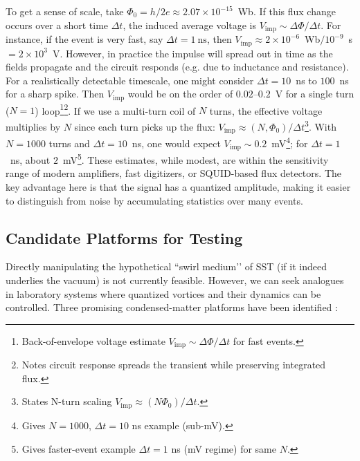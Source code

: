 \documentclass[12pt]{article}
\begin{document}
To get a sense of scale, take $\Phi_{0}=h/2e\approx2.07\times10^{-15}$~Wb. If this flux change occurs over a short time $\Delta t$, the induced average voltage is $V_{\text{imp}} \sim \Delta \Phi/\Delta t$. For instance, if the event is very fast, say $\Delta t = 1~\text{ns}$, then $V_{\text{imp}}\approx 2\times10^{-6}$~Wb$/10^{-9}$~s $= 2\times10^{3}$~V. However, in practice the impulse will spread out in time as the fields propagate and the circuit responds (e.g. due to inductance and resistance). For a realistically detectable timescale, one might consider $\Delta t = 10$~ns to $100$~ns for a sharp spike. Then $V_{\text{imp}}$ would be on the order of $0.02$--$0.2$~V for a single turn ($N=1$) loop\footnote{Back-of-envelope voltage estimate $V_{\text{imp}}\sim\Delta\Phi/\Delta t$ for fast events.}\footnote{Notes circuit response spreads the transient while preserving integrated flux.}. If we use a multi-turn coil of $N$ turns, the effective voltage multiplies by $N$ since each turn picks up the flux: $V_{\text{imp}} \approx (N,\Phi_{0})/\Delta t$\footnote{States N-turn scaling $V_{\text{imp}}\approx (N\Phi_0)/\Delta t$.}. With $N=1000$ turns and $\Delta t=10$~ns, one would expect $V_{\text{imp}}\sim 0.2$~mV\footnote{Gives $N=1000$, $\Delta t=10$ ns example (sub-mV).}; for $\Delta t=1$~ns, about $2$~mV\footnote{Gives faster-event example $\Delta t=1$ ns (mV regime) for same $N$.}. These estimates, while modest, are within the sensitivity range of modern amplifiers, fast digitizers, or SQUID-based flux detectors. The key advantage here is that the signal has a quantized amplitude, making it easier to distinguish from noise by accumulating statistics over many events.





\subsection{Candidate Platforms for Testing}

Directly manipulating the hypothetical ``swirl medium’’ of SST (if it indeed underlies the vacuum) is not currently feasible. However, we can seek analogues in laboratory systems where quantized vortices and their dynamics can be controlled. Three promising condensed-matter platforms have been identified \cite{Iskandarani2025FluxComp}:
\end{document}
